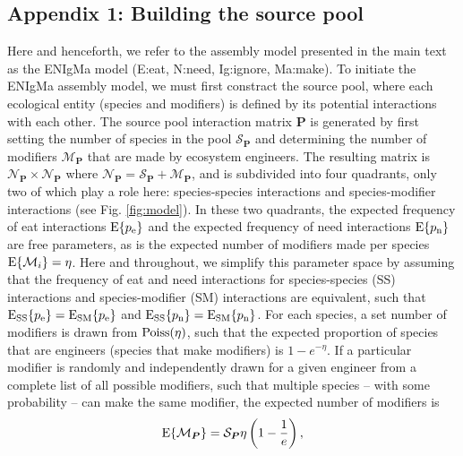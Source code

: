 \documentclass[twocolumn,preprintnumbers,amsmath,amssymb,superscriptaddress,linenumbers]{revtex4-1}
\newcommand{\rr}[1]{{\rm #1}}
\begin{document}
\subsection*{Appendix 1: Building the source pool}
Here and henceforth, we refer to the assembly model presented in the main text as the ENIgMa model (E:eat, N:need, Ig:ignore, Ma:make).
To initiate the ENIgMa assembly model, we must first constract the source pool, where each ecological entity (species and modifiers) is defined by its potential interactions with each other.
The source pool interaction matrix $\bm P$ is generated by first setting the number of species in the pool $\mathcal{S}_{\bm P}$ and determining the number of modifiers $\mathcal{M}_{\bm P}$ that are made by ecosystem engineers.
The resulting matrix is $\mathcal{N}_{\bm P}\times\mathcal{N}_{\bm P}$ where $\mathcal{N}_{\bm P}=\mathcal{S}_{\bm P}+\mathcal{M}_{\bm P}$, and is subdivided into four quadrants, only two of which play a role here: species-species interactions and species-modifier interactions (see Fig. \ref{fig:model}).
In these two quadrants, the expected frequency of eat interactions ${\rm E}\{p_\rr{e}\}$ and the expected frequency of need interactions ${\rm E}\{p_\rr{n}\}$ are free parameters, as is the expected number of modifiers made per species ${\rm E}\{\mathcal{M}_i\}=\eta$.
Here and throughout, we simplify this parameter space by assuming that the frequency of eat and need interactions for species-species (SS) interactions and species-modifier (SM) interactions are equivalent, such that ${\rm E_{SS}}\{p_\rr{e}\} = {\rm E_{SM}}\{p_\rr{e}\}$ and ${\rm E_{SS}}\{p_\rr{n}\} = {\rm E_{SM}}\{p_\rr{n}\}$.
For each species, a set number of modifiers is drawn from ${\rm Poiss}(\eta)$, such that the expected proportion of species that are engineers (species that make modifiers) is $1-{e}^{-\eta}$.
If a particular modifier is randomly and independently drawn for a given engineer from a complete list of all possible modifiers, such that multiple species -- with some probability -- can make the same modifier, the expected number of modifiers is
\begin{equation}
{\rm E}\{\mathcal{M}_{\bm P}\} = \mathcal{S}_{\bm P}\eta\left(1 - \frac{1}{{e}}\right),
\label{eq:total}
\end{equation}
\end{document}
